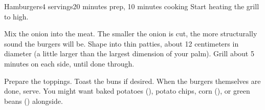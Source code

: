 \documentclass[../Cookbook.tex]{subfiles}
\begin{document}
\begin{recipe}{Hamburgers}{4 servings}{20 minutes prep, 10 minutes cooking}
  Start heating the grill to high.

  Mix the onion into the meat. The smaller the onion is cut, the more structurally sound the burgers will be.
  Shape into thin patties, about 12 centimeters in diameter (a little larger than the largest dimension of your palm).
  Grill about 5 minutes on each side, until done through.

  Prepare the toppings. Toast the buns if desired.
  When the burgers themselves are done, serve. You might want baked potatoes (), potato chips, corn (), or green beans () alongside.
\end{recipe}
\end{document}
